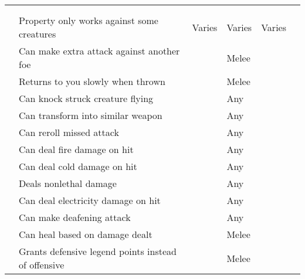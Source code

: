         \onecolumn
        \begin{longtabuwrapper}
            \begin{longtabu}{l X l l l l}
                \\
                 &  &  &  &  &  \\
                 & Property only works against some creatures & Varies & Varies & Varies &  \\
                 & Can make extra attack against another foe &  & Melee &  \\
                 & Returns to you slowly when thrown &  & Melee &  \\
                 & Can knock struck creature flying &  & Any &  \\
                 & Can transform into similar weapon &  & Any &  \\
                 & Can reroll missed attack &  & Any &  \\
                 & Can deal fire damage on hit &  & Any &  \\
                 & Can deal cold damage on hit &  & Any &  \\
                 & Deals nonlethal damage &  & Any &  \\
                 & Can deal electricity damage on hit &  & Any &  \\
                 & Can make deafening attack &  & Any &  \\
                 & Can heal based on damage dealt &  & Melee &  \\
                 & Grants defensive legend points instead of offensive &  & Melee &  \\

\end{longtabu}
\end{longtabuwrapper}
